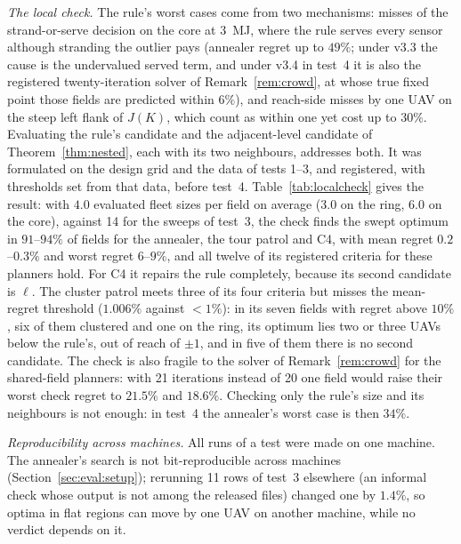 \documentclass[journal,outdir=./]{IEEEtran}
\begin{document}
\textit{The local check.} The rule's worst cases come from two mechanisms: misses of the strand-or-serve decision on the core at 3~MJ, where the rule serves every sensor although stranding the outlier pays (annealer regret up to $49\%$; under v3.3 the cause is the undervalued served term, and under v3.4 in test~4 it is also the registered twenty-iteration solver of Remark~\ref{rem:crowd}, at whose true fixed point those fields are predicted within $6\%$), and reach-side misses by one UAV on the steep left flank of $J(K)$, which count as within one yet cost up to $30\%$. Evaluating the rule's candidate and the adjacent-level candidate of Theorem~\ref{thm:nested}, each with its two neighbours, addresses both. It was formulated on the design grid and the data of tests 1--3, and registered, with thresholds set from that data, before test~4. Table~\ref{tab:localcheck} gives the result: with $4.0$ evaluated fleet sizes per field on average (3.0 on the ring, 6.0 on the core), against 14 for the sweeps of test~3, the check finds the swept optimum in $91$--$94\%$ of fields for the annealer, the tour patrol and C4, with mean regret $0.2$--$0.3\%$ and worst regret $6$--$9\%$, and all twelve of its registered criteria for these planners hold. For C4 it repairs the rule completely, because its second candidate is $\ell$. The cluster patrol meets three of its four criteria but misses the mean-regret threshold ($1.006\%$ against $<1\%$): in its seven fields with regret above $10\%$, six of them clustered and one on the ring, its optimum lies two or three UAVs below the rule's, out of reach of $\pm1$, and in five of them there is no second candidate. The check is also fragile to the solver of Remark~\ref{rem:crowd} for the shared-field planners: with 21 iterations instead of 20 one field would raise their worst check regret to $21.5\%$ and $18.6\%$. Checking only the rule's size and its neighbours is not enough: in test~4 the annealer's worst case is then $34\%$.

\textit{Reproducibility across machines.} All runs of a test were made on one machine. The annealer's search is not bit-reproducible across machines (Section~\ref{sec:eval:setup}); rerunning 11 rows of test~3 elsewhere (an informal check whose output is not among the released files) changed one by $1.4\%$, so optima in flat regions can move by one UAV on another machine, while no verdict depends on it.
\end{document}
